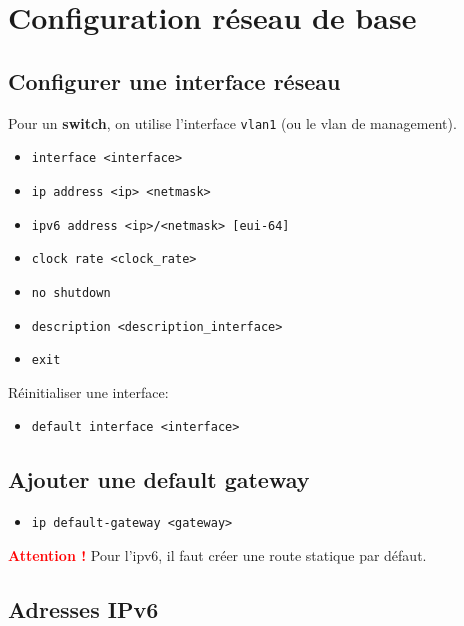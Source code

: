 \documentclass[a4paper]{article}
\begin{document}
\section{Configuration réseau de base}





\subsection{Configurer une interface réseau}



Pour un \textbf{switch}, on utilise l'interface \texttt{vlan1} (ou le vlan de management).
\begin{itemize}[label=\textbf{–}]
    \item \texttt{interface <interface>}
    \item \texttt{ip address <ip> <netmask>}
    \item \texttt{ipv6 address <ip>/<netmask> [eui-64]}
    \item \texttt{clock rate <clock\_rate>}
    \item \texttt{no shutdown}
    \item \texttt{description <description\_interface>}
    \item \texttt{exit}
\end{itemize}
Réinitialiser une interface:
\begin{itemize}[label=\textbf{–}]
    \item \texttt{default interface <interface>}
\end{itemize}





\subsection{Ajouter une default gateway}



\begin{itemize}[label=\textbf{–}]
    \item \texttt{ip default-gateway <gateway>}
\end{itemize}
\textcolor{red}{\textbf{Attention !}} Pour l'ipv6, il faut créer une route statique par défaut.





\subsection{Adresses IPv6}
\end{document}

